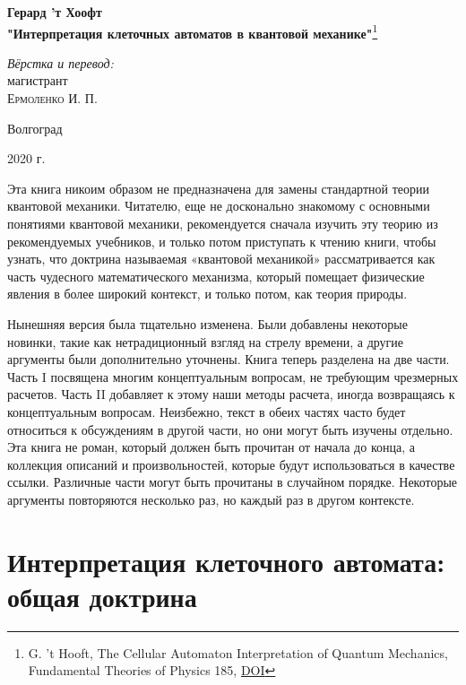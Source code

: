 \documentclass[aps,%
12pt,%
final,%
oneside,
onecolumn,%
musixtex, %
superscriptaddress,%
centertags]{article} %
\begin{document}
\begin{titlepage} 
\begin{center}

\textbf{\Large Герард ’т Хоофт}\\[0.5cm]
\textbf{\LARGE "Интерпретация клеточных автоматов в квантовой механике"}\footnote{G. 't Hooft, The Cellular Automaton Interpretation of Quantum Mechanics,
Fundamental Theories of Physics 185, \href{https://doi.org/10.1007/978-3-319-41285-6_2}{DOI}}\\[3.0cm]


\begin{flushright} \large
\emph{Вёрстка и перевод:} \\
магистрант \\
\textsc{Ермоленко И. П.}
\end{flushright}


\vfill 

{\large {Волгоград}} \par
{\large {2020 г.}}
\end{center} 
\end{titlepage}

Эта книга никоим образом не предназначена для замены стандартной теории квантовой механики. Читателю, еще не досконально знакомому с основными понятиями квантовой механики, рекомендуется сначала изучить эту теорию из рекомендуемых учебников, и только потом приступать к чтению книги, чтобы узнать, что доктрина называемая «квантовой механикой» рассматривается как часть чудесного математического механизма, который помещает физические явления в более широкий контекст, и только потом, как теория природы. 

Нынешняя версия была тщательно изменена. Были добавлены некоторые новинки, такие как нетрадиционный взгляд на стрелу времени, а другие аргументы были дополнительно уточнены. Книга теперь разделена на две части. Часть I посвящена многим концептуальным вопросам, не требующим чрезмерных расчетов. Часть II добавляет к этому наши методы расчета, иногда возвращаясь к концептуальным вопросам. Неизбежно, текст в обеих частях часто будет относиться к обсуждениям в другой части, но они могут быть изучены отдельно. Эта книга не роман, который должен быть прочитан от начала до конца, а коллекция описаний и произвольностей, которые будут использоваться в качестве ссылки. Различные части могут быть прочитаны в случайном порядке. Некоторые аргументы повторяются несколько раз, но каждый раз в другом контексте.

\newpage

\tableofcontents

\newpage

\part{Интерпретация клеточного автомата: общая доктрина}




%
\end{document}
